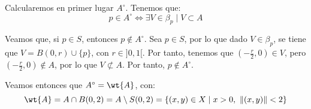 \documentclass[12pt]{article}
\begin{document}
\begin{ejercicio}[5 puntos]
\begin{enumerate}
\begin{figure}[H]
          \end{figure}

          Calcularemos en primer lugar $A^\circ$. Tenemos que:
          \begin{equation*}
            p\in A^\circ \Longleftrightarrow \exists V\in \beta_p \mid V \subset A
          \end{equation*}

          Veamos que, si $p\in S$, entonces $p\notin A^\circ$. Sea $p\in S$,
          por lo que dado $V\in \beta_p$, se tiene que $V=B(0,r)\cup \{p\}$,
          con $r\in ]0,1[$. Por tanto, tenemos que $\left(-\frac{r}{2},0\right)\in V$,
          pero $\left(-\frac{r}{2},0\right)\notin A$, por lo que $V\not\subset A$. Por tanto,
          $p\notin A^\circ$.

          Veamos entonces que $A^\circ = \wt{A}$, con:
          \begin{equation*}
            \wt{A} = A\cap B(0,2) = A\setminus S(0,2) = \{(x,y)\in X \mid x>0,~\|(x,y)\|<2\}
          \end{equation*}


\end{enumerate}
\end{ejercicio}
\end{document}
